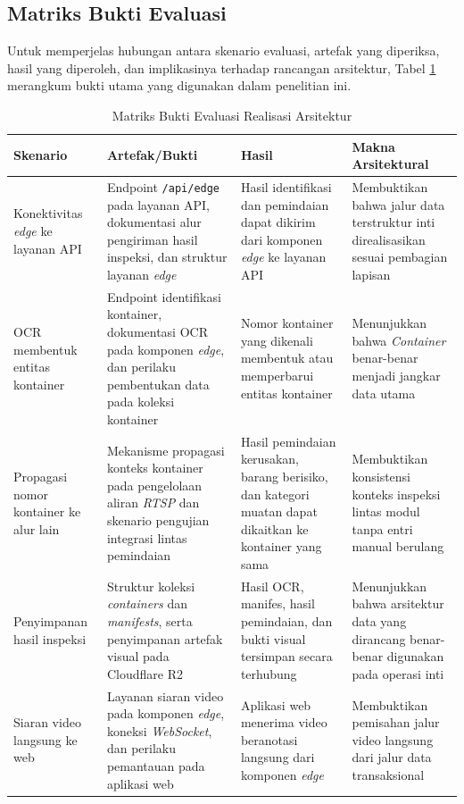 \subsection{Matriks Bukti Evaluasi}
\label{subsec:matriks-bukti-evaluasi}

Untuk memperjelas hubungan antara skenario evaluasi, artefak yang diperiksa,
hasil yang diperoleh, dan implikasinya terhadap rancangan arsitektur, Tabel
\ref{tbl:matriks-bukti-evaluasi} merangkum bukti utama yang digunakan dalam
penelitian ini.

\begin{table}[ht]
    \centering
    \small
    \caption{Matriks Bukti Evaluasi Realisasi Arsitektur}
    \label{tbl:matriks-bukti-evaluasi}
    \begin{tabular}{p{} p{} p{} p{}}
        \toprule
        \textbf{Skenario} & \textbf{Artefak/Bukti} & \textbf{Hasil} & \textbf{Makna Arsitektural} \\
        \midrule
        Konektivitas \textit{edge} ke layanan API & Endpoint \texttt{/api/edge} pada layanan API, dokumentasi alur pengiriman hasil inspeksi, dan struktur layanan \textit{edge} & Hasil identifikasi dan pemindaian dapat dikirim dari komponen \textit{edge} ke layanan API & Membuktikan bahwa jalur data terstruktur inti direalisasikan sesuai pembagian lapisan \\
        OCR membentuk entitas kontainer & Endpoint identifikasi kontainer, dokumentasi OCR pada komponen \textit{edge}, dan perilaku pembentukan data pada koleksi kontainer & Nomor kontainer yang dikenali membentuk atau memperbarui entitas kontainer & Menunjukkan bahwa \textit{Container} benar-benar menjadi jangkar data utama \\
        Propagasi nomor kontainer ke alur lain & Mekanisme propagasi konteks kontainer pada pengelolaan aliran \textit{RTSP} dan skenario pengujian integrasi lintas pemindaian & Hasil pemindaian kerusakan, barang berisiko, dan kategori muatan dapat dikaitkan ke kontainer yang sama & Membuktikan konsistensi konteks inspeksi lintas modul tanpa entri manual berulang \\
        Penyimpanan hasil inspeksi & Struktur koleksi \textit{containers} dan \textit{manifests}, serta penyimpanan artefak visual pada Cloudflare R2 & Hasil OCR, manifes, hasil pemindaian, dan bukti visual tersimpan secara terhubung & Menunjukkan bahwa arsitektur data yang dirancang benar-benar digunakan pada operasi inti \\
        Siaran video langsung ke web & Layanan siaran video pada komponen \textit{edge}, koneksi \textit{WebSocket}, dan perilaku pemantauan pada aplikasi web & Aplikasi web menerima video beranotasi langsung dari komponen \textit{edge} & Membuktikan pemisahan jalur video langsung dari jalur data transaksional \\

\end{tabular}
\end{table}
